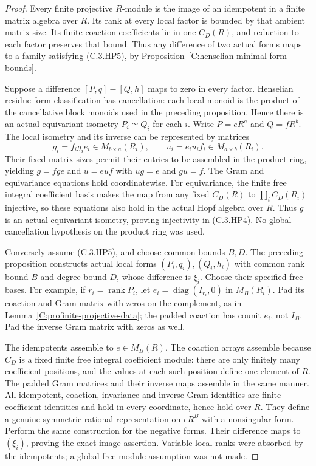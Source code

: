 \begin{proof}
Every finite projective $R$-module is the image of
an idempotent in a finite matrix algebra over $R$.
Its rank at every local factor is bounded by that
ambient matrix size.  Its finite coaction coefficients
lie in one $C_D(R)$, and reduction to each factor
preserves that bound.  Thus any difference of two
actual forms maps to a family satisfying (C.3.HP5),
by Proposition~\ref{C:henselian-minimal-form-bounds}.

Suppose a difference $[P,q]-[Q,h]$ maps to zero in
every factor.  Henselian residue-form classification
has cancellation: each local monoid is the product
of the cancellative block monoids used in the
preceding proposition.  Hence there is an actual
equivariant isometry $P_i\simeq Q_i$ for each $i$.
Write $P=eR^a$ and $Q=fR^b$.
The local isometry and its inverse can be represented
by matrices
\[
 g_i=f_i g_i e_i\in M_{b\times a}(R_i),
 \qquad u_i=e_i u_i f_i\in M_{a\times b}(R_i).
\]
Their fixed matrix sizes permit their entries to
be assembled in the product ring, yielding
$g=fge$ and $u=euf$ with $ug=e$ and $gu=f$.
The Gram and equivariance equations hold coordinatewise.
For equivariance, the finite free integral coefficient
basis makes the map from any fixed $C_D(R)$ to
$\prod_i C_D(R_i)$ injective, so these equations
also hold in the actual Hopf algebra over $R$.
Thus $g$ is an actual equivariant isometry, proving
injectivity in (C.3.HP4).  No global cancellation
hypothesis on the product ring was used.

Conversely assume (C.3.HP5), and choose common
bounds $B,D$.  The preceding proposition constructs
actual local forms $(P_i,q_i),(Q_i,h_i)$ with
common rank bound $B$ and degree bound $D$, whose
difference is $\xi_i$.
Choose their specified free bases.  For example,
if $r_i=\operatorname{rank}P_i$, let
$e_i=\operatorname{diag}(I_{r_i},0)$ in $M_B(R_i)$.
Pad its coaction and Gram matrix with zeros on the
complement, as in
Lemma~\ref{C:profinite-projective-data}; the padded
coaction has counit $e_i$, not $I_B$.
Pad the inverse Gram matrix with zeros as well.

The idempotents assemble to $e\in M_B(R)$.
The coaction arrays assemble because $C_D$ is a
fixed finite free integral coefficient module:
there are only finitely many coefficient positions,
and the values at each such position define one
element of $R$.  The padded Gram matrices and their
inverse maps assemble in the same manner.
All idempotent, coaction, invariance and inverse-Gram
identities are finite coefficient identities and
hold in every coordinate, hence hold over $R$.
They define a genuine symmetric rational representation
on $eR^B$ with a nonsingular form.  Perform the
same construction for the negative forms.
Their difference maps to $(\xi_i)$, proving the
exact image assertion.  Variable local ranks were
absorbed by the idempotents; a global free-module
assumption was not made.


\end{proof}
